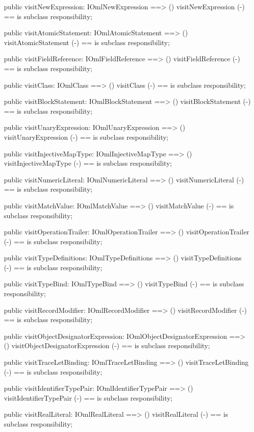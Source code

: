\begin{vdm_al}
  public visitNewExpression: IOmlNewExpression ==> ()
  visitNewExpression (-) == is subclass responsibility;

  public visitAtomicStatement: IOmlAtomicStatement ==> ()
  visitAtomicStatement (-) == is subclass responsibility;

  public visitFieldReference: IOmlFieldReference ==> ()
  visitFieldReference (-) == is subclass responsibility;

  public visitClass: IOmlClass ==> ()
  visitClass (-) == is subclass responsibility;

  public visitBlockStatement: IOmlBlockStatement ==> ()
  visitBlockStatement (-) == is subclass responsibility;

  public visitUnaryExpression: IOmlUnaryExpression ==> ()
  visitUnaryExpression (-) == is subclass responsibility;

  public visitInjectiveMapType: IOmlInjectiveMapType ==> ()
  visitInjectiveMapType (-) == is subclass responsibility;

  public visitNumericLiteral: IOmlNumericLiteral ==> ()
  visitNumericLiteral (-) == is subclass responsibility;

  public visitMatchValue: IOmlMatchValue ==> ()
  visitMatchValue (-) == is subclass responsibility;

  public visitOperationTrailer: IOmlOperationTrailer ==> ()
  visitOperationTrailer (-) == is subclass responsibility;

  public visitTypeDefinitions: IOmlTypeDefinitions ==> ()
  visitTypeDefinitions (-) == is subclass responsibility;

  public visitTypeBind: IOmlTypeBind ==> ()
  visitTypeBind (-) == is subclass responsibility;

  public visitRecordModifier: IOmlRecordModifier ==> ()
  visitRecordModifier (-) == is subclass responsibility;

  public visitObjectDesignatorExpression: IOmlObjectDesignatorExpression ==> ()
  visitObjectDesignatorExpression (-) == is subclass responsibility;

  public visitTraceLetBinding: IOmlTraceLetBinding ==> ()
  visitTraceLetBinding (-) == is subclass responsibility;

  public visitIdentifierTypePair: IOmlIdentifierTypePair ==> ()
  visitIdentifierTypePair (-) == is subclass responsibility;

  public visitRealLiteral: IOmlRealLiteral ==> ()
  visitRealLiteral (-) == is subclass responsibility;


\end{vdm_al}
